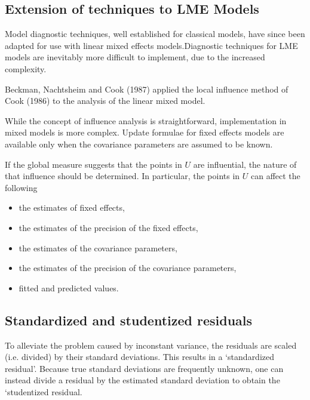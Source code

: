 \documentclass[12pt, a4paper]{article}
\begin{document}
\newpage
\subsection{Extension of techniques to LME Models} %


Model diagnostic techniques, well established for classical models, have since been adapted for use with linear mixed effects models.Diagnostic techniques for LME models are inevitably more difficult to implement, due to the increased complexity.


Beckman, Nachtsheim and Cook (1987) \citet{Beckman} applied the local influence method of Cook (1986) to the analysis of the linear mixed model.


While the concept of influence analysis is straightforward, implementation in mixed models is more complex. Update formulae for fixed effects models are available only when the covariance parameters are assumed to be known.


If the global measure suggests that the points in $U$ are influential, the nature of that influence should be determined. In particular, the points in $U$ can affect the following


\begin{itemize}
	\item the estimates of fixed effects,
	\item the estimates of the precision of the fixed effects,
	\item the estimates of the covariance parameters,
	\item the estimates of the precision of the covariance parameters,
	\item fitted and predicted values.
\end{itemize}








\newpage
\subsection{Standardized and studentized residuals} %

To alleviate the problem caused by inconstant variance, the residuals are scaled (i.e. divided) by their standard deviations. This results in a `standardized residual'. Because true standard deviations are frequently unknown, one can instead divide a residual by the estimated standard deviation to obtain the `studentized residual. 
\end{document}
